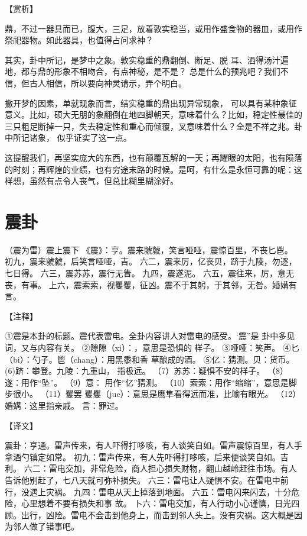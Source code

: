 \documentclass[a4paper,12pt,UTF8,twoside]{ctexbook}
\begin{document}
【赏析】

鼎，不过一器具而已，腹大，三足，放着敦实稳当，或用作盛食物的器皿，或用作祭祀器物。如此器具，也值得占问求神？

其实，卦中所记，是梦中之象。敦实稳重的鼎翻倒、断足、脱 耳、洒得汤汁遍地，都与鼎的形象不相吻合，有点神秘，是不是？ 总是什么的预兆吧？我们不信，但古人相信，所以要向神灵请示，弄个明白。

撇开梦的因素，单就现象而言，结实稳重的鼎出现异常现象， 可以具有某种象征意义。比如，硕大无朋的象翻倒在地四脚朝天，意味着什么？比如，稳定性最佳的三只粗足断掉一只，失去稳定性和重心而倾覆，叉意味着什么？全是不祥之兆。卦中所记诸象， 似乎证实了这一点。

这提醒我们，再坚实庞大的东西，也有颠覆瓦解的一天；再耀眼的太阳，也有陨落的时刻；再辉煌的业绩，也有穷途末路的时候。是呵，有什么是永恒可靠的呢：这样想，虽然有点令人丧气，但总比糊里糊涂好。

\chapter{震卦}

（震为雷）震上震下
《震》：亨。震来虩虩，笑言哑哑，震惊百里，不丧匕鬯。
初九，震来虩虩，后笑言哑哑，吉。
六二，震来厉，亿丧贝，跻于九陵，勿逐，七日得。
六三，震苏苏，震行无眚。
九四，震遂泥。
六五，震往来，厉，意无丧，有事。
上六，震索索，视矍矍，征凶。震不于其躬，于其邻，无咎。婚媾有言。

【注释】

①震是本卦的标题。震代表雷电。全卦内容讲人对雷电的感受。‘震”是 卦中多见词，又与内容有关。
②隙隙（xi）：，意思是恐惧的 样子。
③哑哑：笑声。
④匕（bi）：勺子。鬯（chang）：用黑黍和香 草酿成的酒。
⑤亿：猜测。贝：货币。
(6)跻：攀登。九陵：九重山， 指极远。
（7）苏苏：疑惧不安的样子。
（8）遂：用作“坠”。
（9）意： 用作“亿”猜测。
（10）索索：用作“缩缩”，意思是脚步很小。
（11）矍罢 矍矍（jue）：意思是鹰隼看得远而准，比喻有眼光。
（12）婚媾：这里指亲戚。 言：罪过。

【译文】

震卦：亨通。雷声传来，有人吓得打哆咳，有人谈笑自如。雷声震惊百里，有人手拿酒勺镇定如常。
初九：雷声传来，有人先吓得打哆咳，后来便谈笑自如。吉利。
六二：雷电交加，非常危险，商人担心损失财物，翻山越岭赶往市场。有人告诉他别赶了，七八天就可弥补损失。
六三：雷电让人疑惧不安。在雷电中前行，没遇上灾祸。
九四：雷电从天上掉落到地面。 六五：雷电闪来闪去，十分危险，心里想着不要有损失和事 故。
卜六：雷电交加，有人行动小心谨慎，日光四顾。出行，凶险。雷电不会击到他身上，而击到邻人头上。没有灾祸。这大概是因为邻人做了错事吧。
\end{document}
